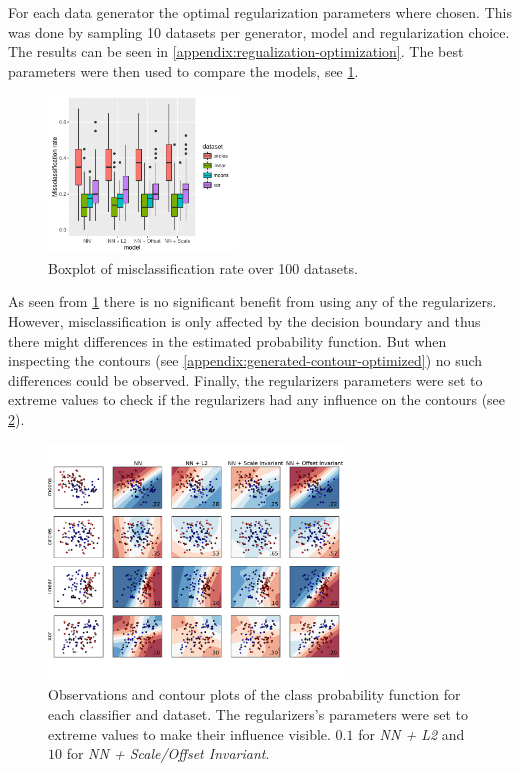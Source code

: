 For each data generator the optimal regularization parameters where chosen. This was done by sampling 10 datasets per generator, model and regularization choice. The results can be seen in \cref{appendix:regualization-optimization}. The best parameters were then used to compare the models, see \cref{fig:2d_significant}.

\begin{figure}[h]
	\centering
	\includegraphics[width=0.45\textwidth]{plots/2d_significant}
	\caption{Boxplot of misclassification rate over 100 datasets.}
	\label{fig:2d_significant}
\end{figure}

As seen from \cref{fig:2d_significant} there is no significant benefit from using any of the regularizers. However, misclassification is only affected by the decision boundary and thus there might differences in the estimated probability function. But when inspecting the contours (see \cref{appendix:generated-contour-optimized}) no such differences could be observed. Finally, the regularizers parameters were set to extreme values to check if the regularizers had any influence on the contours (see \cref{plt:generated-contour-extream}).

\begin{figure}[ht]
	\centering
	\includegraphics[width=0.7\textwidth, trim = 0 2.2cm 0 1.5cm, clip]{plots/2d_classifier-extream}
	\caption{Observations and contour plots of the class probability function for each classifier and dataset. The regularizers's parameters were set to extreme values to make their influence visible. $0.1$ for \textit{NN + L2} and $10$ for \textit{NN + Scale/Offset Invariant}.}
	\label{plt:generated-contour-extream}
\end{figure}
